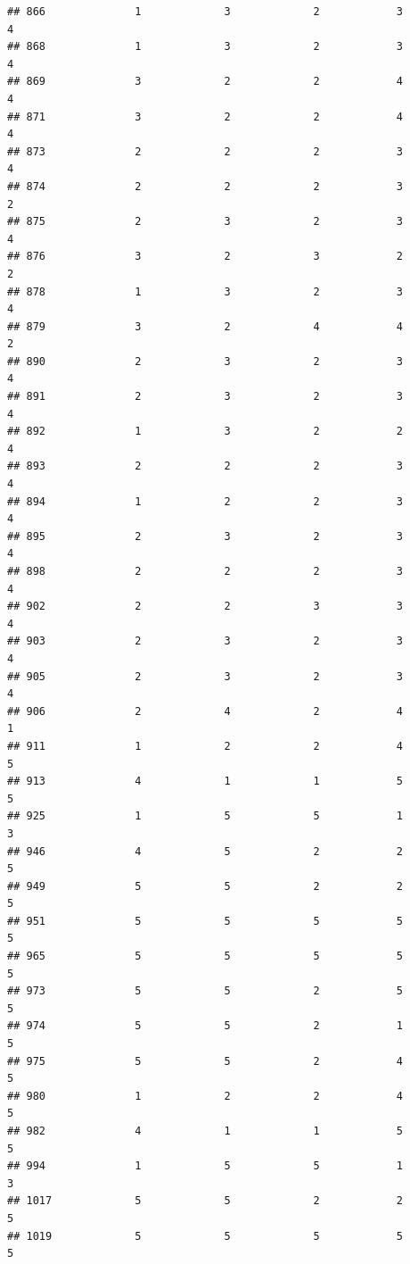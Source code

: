 \documentclass[
]{article}
\begin{document}
\begin{verbatim}
## 866              1             3             2            3          4
## 868              1             3             2            3          4
## 869              3             2             2            4          4
## 871              3             2             2            4          4
## 873              2             2             2            3          4
## 874              2             2             2            3          2
## 875              2             3             2            3          4
## 876              3             2             3            2          2
## 878              1             3             2            3          4
## 879              3             2             4            4          2
## 890              2             3             2            3          4
## 891              2             3             2            3          4
## 892              1             3             2            2          4
## 893              2             2             2            3          4
## 894              1             2             2            3          4
## 895              2             3             2            3          4
## 898              2             2             2            3          4
## 902              2             2             3            3          4
## 903              2             3             2            3          4
## 905              2             3             2            3          4
## 906              2             4             2            4          1
## 911              1             2             2            4          5
## 913              4             1             1            5          5
## 925              1             5             5            1          3
## 946              4             5             2            2          5
## 949              5             5             2            2          5
## 951              5             5             5            5          5
## 965              5             5             5            5          5
## 973              5             5             2            5          5
## 974              5             5             2            1          5
## 975              5             5             2            4          5
## 980              1             2             2            4          5
## 982              4             1             1            5          5
## 994              1             5             5            1          3
## 1017             5             5             2            2          5
## 1019             5             5             5            5          5

\end{verbatim}
\end{document}
